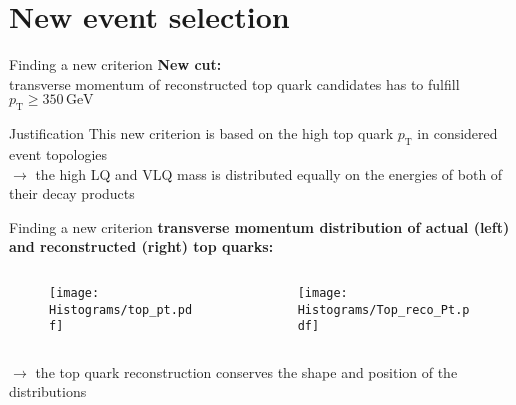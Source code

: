 \documentclass[aspectratio=1610, professionalfonts, 9pt]{beamer}
\begin{document}
\section{New event selection}
\begin{frame}{Finding a new criterion}
    \textbf{New cut:} \\
    transverse momentum of reconstructed top quark candidates has to fulfill \(p_{\mathrm{T}} \ge 350 \, \mathrm{GeV}\) \\

    \begin{block}{Justification}
        This new criterion is based on the high top quark \(p_{\mathrm{T}}\) in considered event topologies \\
        \(\rightarrow\) the high LQ and VLQ mass is distributed equally on the energies of both of their decay products
    \end{block}
\end{frame}

\begin{frame}{Finding a new criterion}
  \textbf{transverse momentum distribution of actual (left) and reconstructed (right) top quarks:}
    \begin{columns}
        \begin{column}{0.5\textwidth}
            \begin{figure}
                \centering
                \texttt{[image: Histograms/top\_pt.pdf]}
                \label{fig:new_crit1}
            \end{figure}
        \end{column}
        \begin{column}{0.5\textwidth}
            \begin{figure}
                \centering
                \texttt{[image: Histograms/Top\_reco\_Pt.pdf]}
                \label{fig:new_crit2}
            \end{figure}
        \end{column}
    \end{columns}
    \(\rightarrow\) the top quark reconstruction conserves the shape and position of the distributions
\end{frame}
\end{document}
